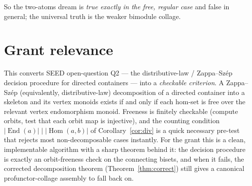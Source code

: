 \documentclass[11pt]{article}
\theoremstyle{definition}
\newcommand{\Hom}{\operatorname{Hom}}
\newcommand{\End}{\operatorname{End}}
\begin{document}
So the two-atoms dream is \emph{true exactly in the free, regular case} and
false in general; the universal truth is the weaker bimodule collage.

\section{Grant relevance}

This converts SEED open-question Q2 --- the distributive-law / Zappa--Sz\'ep
decision procedure for directed containers --- into a \emph{checkable
criterion}. A Zappa--Sz\'ep (equivalently, distributive-law) decomposition of a
directed container into a skeleton and its vertex monoids exists if and only if
each hom-set is free over the relevant vertex endomorphism monoid. Freeness is
finitely checkable (compute orbits, test that each orbit map is injective), and
the counting condition $\lvert \End(a)\rvert \mid \lvert \Hom(a,b)\rvert$ of
Corollary~\ref{cor:div} is a quick necessary pre-test that rejects most
non-decomposable cases instantly. For the grant this is a clean, implementable
algorithm with a sharp theorem behind it: the decision procedure is exactly an
orbit-freeness check on the connecting bisets, and when it fails, the corrected
decomposition theorem (Theorem~\ref{thm:correct}) still gives a canonical
profunctor-collage assembly to fall back on.
\end{document}
